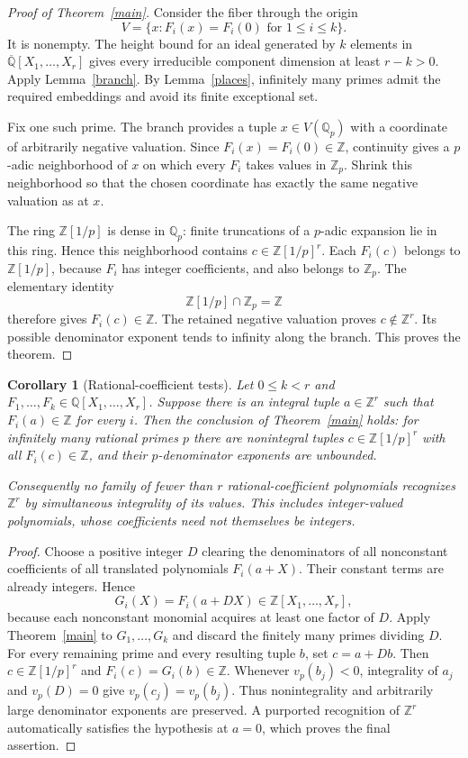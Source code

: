 \documentclass[11pt]{article}
\newtheorem{corollary}[theorem]{Corollary}
\newcommand{\Q}{\mathbb Q}\newcommand{\Z}{\mathbb Z}
\begin{document}
\begin{proof}[Proof of Theorem~\ref{main}]
Consider the fiber through the origin
\[
 V=\{x:F_i(x)=F_i(0)\text{ for }1\le i\le k\}.
\]
It is nonempty. The height bound for an ideal generated by $k$ elements
in $\overline{\Q}[X_1,\ldots,X_r]$ gives every irreducible component
dimension at least $r-k>0$. Apply Lemma~\ref{branch}. By
Lemma~\ref{places}, infinitely many primes admit the required embeddings
and avoid its finite exceptional set.

Fix one such prime. The branch provides a tuple $x\in V(\Q_p)$ with a
coordinate of arbitrarily negative valuation. Since $F_i(x)=F_i(0)\in\Z$,
continuity gives a $p$-adic neighborhood of $x$ on which every $F_i$ takes
values in $\Z_p$. Shrink this neighborhood so that the chosen coordinate
has exactly the same negative valuation as at $x$.

The ring $\Z[1/p]$ is dense in $\Q_p$: finite truncations of a $p$-adic
expansion lie in this ring. Hence this neighborhood contains
$c\in\Z[1/p]^r$. Each $F_i(c)$ belongs to $\Z[1/p]$, because $F_i$ has
integer coefficients, and also belongs to $\Z_p$. The elementary identity
\[
                         \Z[1/p]\cap\Z_p=\Z
\]
therefore gives $F_i(c)\in\Z$. The retained negative valuation proves
$c\notin\Z^r$. Its possible denominator exponent tends to infinity along
the branch. This proves the theorem.
\end{proof}

\begin{corollary}[Rational-coefficient tests]\label{rational-coefficients}
Let $0\le k<r$ and $F_1,\ldots,F_k\in\Q[X_1,\ldots,X_r]$.
Suppose there is an integral tuple $a\in\Z^r$ such that
$F_i(a)\in\Z$ for every $i$. Then the conclusion of
Theorem~\ref{main} holds: for infinitely many rational primes $p$ there
are nonintegral tuples $c\in\Z[1/p]^r$ with all $F_i(c)\in\Z$, and
their $p$-denominator exponents are unbounded.

Consequently no family of fewer than $r$ rational-coefficient
polynomials recognizes $\Z^r$ by simultaneous integrality of its values.
This includes integer-valued polynomials, whose coefficients need not
themselves be integers.
\end{corollary}
\begin{proof}
Choose a positive integer $D$ clearing the denominators of all
nonconstant coefficients of all translated polynomials $F_i(a+X)$.
Their constant terms are already integers. Hence
\[
                       G_i(X)=F_i(a+DX)\in\Z[X_1,\ldots,X_r],
\]
because each nonconstant monomial acquires at least one factor of $D$.
Apply Theorem~\ref{main} to $G_1,\ldots,G_k$ and discard the finitely
many primes dividing $D$. For every remaining prime and every resulting
tuple $b$, set $c=a+Db$. Then $c\in\Z[1/p]^r$ and
$F_i(c)=G_i(b)\in\Z$. Whenever $v_p(b_j)<0$, integrality of $a_j$ and
$v_p(D)=0$ give $v_p(c_j)=v_p(b_j)$. Thus nonintegrality and arbitrarily
large denominator exponents are preserved. A purported recognition of
$\Z^r$ automatically satisfies the hypothesis at $a=0$, which proves
the final assertion.
\end{proof}
\end{document}
